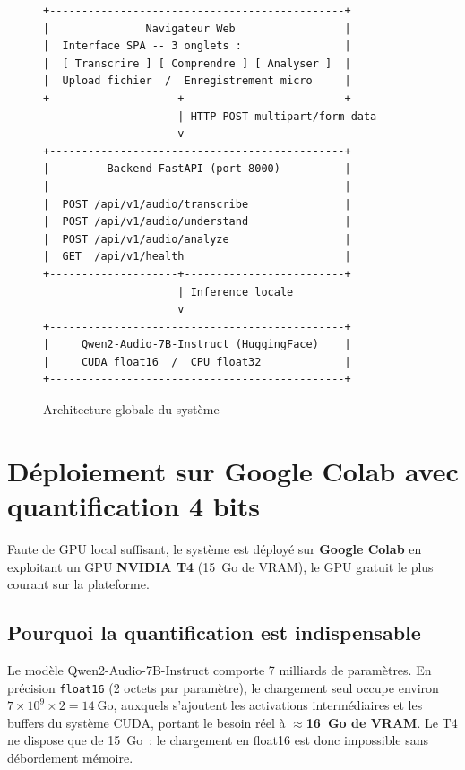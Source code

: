 \documentclass[12pt,a4paper]{report}
\begin{document}
\begin{figure}[h]
\centering
\begin{Verbatim}[frame=single, rulecolor=\color{accent}, fontsize=\small]
+----------------------------------------------+
|               Navigateur Web                 |
|  Interface SPA -- 3 onglets :                |
|  [ Transcrire ] [ Comprendre ] [ Analyser ]  |
|  Upload fichier  /  Enregistrement micro     |
+--------------------+-------------------------+
                     | HTTP POST multipart/form-data
                     v
+----------------------------------------------+
|         Backend FastAPI (port 8000)          |
|                                              |
|  POST /api/v1/audio/transcribe               |
|  POST /api/v1/audio/understand               |
|  POST /api/v1/audio/analyze                  |
|  GET  /api/v1/health                         |
+--------------------+-------------------------+
                     | Inference locale
                     v
+----------------------------------------------+
|     Qwen2-Audio-7B-Instruct (HuggingFace)    |
|     CUDA float16  /  CPU float32             |
+----------------------------------------------+
\end{Verbatim}
\caption{Architecture globale du système}
\end{figure}

\section{Déploiement sur Google Colab avec quantification 4 bits}

Faute de GPU local suffisant, le système est déployé sur \textbf{Google Colab} en
exploitant un GPU \textbf{NVIDIA T4} (15~Go de VRAM), le GPU gratuit le plus courant
sur la plateforme.

\subsection{Pourquoi la quantification est indispensable}

Le modèle Qwen2-Audio-7B-Instruct comporte 7 milliards de paramètres. En précision
\texttt{float16} (2 octets par paramètre), le chargement seul occupe environ
$7 \times 10^9 \times 2 = 14~\mathrm{Go}$, auxquels s'ajoutent les activations
intermédiaires et les buffers du système CUDA, portant le besoin réel à
\textbf{$\approx$16~Go de VRAM}. Le T4 ne dispose que de 15~Go~: le chargement en
float16 est donc impossible sans débordement mémoire.
\end{document}
